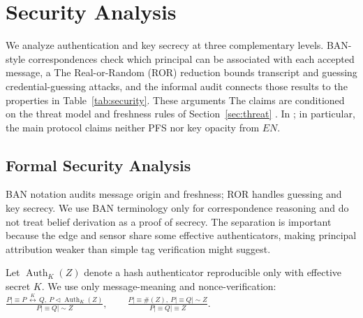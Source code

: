 \documentclass[cmc,article,submit,moreauthors,pdftex]{Definitions/tsp}
\providecommand{\bel}{\mathrel{\mid\!\equiv}}
\providecommand{\said}{\mathrel{\mid\!\sim}}
\providecommand{\sees}{\mathrel{\triangleleft}}
\providecommand{\fresh}[1]{\#(#1)}
\providecommand{\shk}[3]{#1\,\overset{#2}{\leftrightarrow}\,#3}
\providecommand{\DIFadd}[1]{{\protect\color{blue} \sf #1}} %
\providecommand{\DIFdel}[1]{{\protect\color{red} \scriptsize #1}} %
\providecommand{\DIFaddbegin}{} %
\providecommand{\DIFaddend}{} %
\providecommand{\DIFdelbegin}{} %
\providecommand{\DIFdelend}{} %
\begin{document}
\section{Security Analysis}\label{sec:security}

\DIFdelbegin \DIFdel{We analyze authentication and key secrecy at three complementary levels. BAN-style correspondences check which principal can be associated with each accepted message, a }\DIFdelend \DIFaddbegin \DIFadd{The }\DIFaddend Real-or-Random (ROR) reduction bounds transcript and \DIFdelbegin \DIFdel{guessing }\DIFdelend \DIFaddbegin \DIFadd{credential-guessing }\DIFaddend attacks, and the informal audit connects those results to \DIFdelbegin \DIFdel{the properties in }\DIFdelend Table~\ref{tab:security}. \DIFdelbegin \DIFdel{These arguments }\DIFdelend \DIFaddbegin \DIFadd{The claims }\DIFaddend are conditioned on the threat model and freshness rules of Section~\ref{sec:threat}\DIFdelbegin \DIFdel{. In }\DIFdelend \DIFaddbegin \DIFadd{; in }\DIFaddend particular, the main protocol claims neither PFS nor key opacity from $EN$.

\subsection{Formal Security Analysis}\label{sec:formal}

\DIFdelbegin \DIFdel{BAN notation \cite{burrows,li2015enhancement} audits message origin and freshness; ROR handles guessing and key secrecy. We use BAN terminology only for correspondence reasoning and do not treat belief derivation as a proof of secrecy. The separation is important because the edge and sensor share some effective authenticators, making principal attribution weaker than simple tag verification might suggest.
}%


\DIFdel{Let $\operatorname{Auth}_K(Z)$ denote a hash authenticator reproducible only with effective secret $K$. We use only message-meaning and nonce-verification:
}%
\DIFdel{$\displaystyle
 \frac{P\bel \shk{P}{K}{Q},\ P\sees\operatorname{Auth}_{K}(Z)}{P\bel Q\said Z},\qquad
 \frac{P\bel\fresh{Z},\ P\bel Q\said Z}{P\bel Q\bel Z}.$
}%
\end{document}

